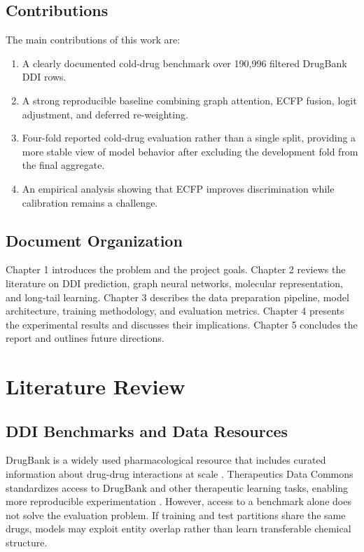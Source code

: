 \documentclass[12pt,a4paper]{report}
\begin{document}
\section{Contributions}
The main contributions of this work are:
\begin{enumerate}
    \item A clearly documented cold-drug benchmark over 190{,}996 filtered DrugBank DDI rows.
    \item A strong reproducible baseline combining graph attention, ECFP fusion, logit adjustment, and deferred re-weighting.
    \item Four-fold reported cold-drug evaluation rather than a single split, providing a more stable view of model behavior after excluding the development fold from the final aggregate.
    \item An empirical analysis showing that ECFP improves discrimination while calibration remains a challenge.
\end{enumerate}

\section{Document Organization}
Chapter 1 introduces the problem and the project goals. Chapter 2 reviews the literature on DDI prediction, graph neural networks, molecular representation, and long-tail learning. Chapter 3 describes the data preparation pipeline, model architecture, training methodology, and evaluation metrics. Chapter 4 presents the experimental results and discusses their implications. Chapter 5 concludes the report and outlines future directions.

\chapter{Literature Review}
\section{DDI Benchmarks and Data Resources}
DrugBank is a widely used pharmacological resource that includes curated information about drug-drug interactions at scale \cite{wishart2018drugbank}. Therapeutics Data Commons standardizes access to DrugBank and other therapeutic learning tasks, enabling more reproducible experimentation \cite{huang2021tdc}. However, access to a benchmark alone does not solve the evaluation problem. If training and test partitions share the same drugs, models may exploit entity overlap rather than learn transferable chemical structure.
\end{document}
